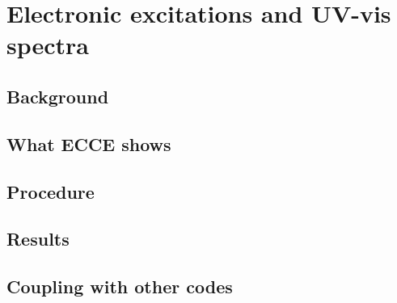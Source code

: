 \chapter{Electronic excitations and UV-vis spectra}
\label{ch:excited-states}


\section{Background}

\section{What ECCE shows}

\section{Procedure}

\section{Results}

\section{Coupling with other codes}

